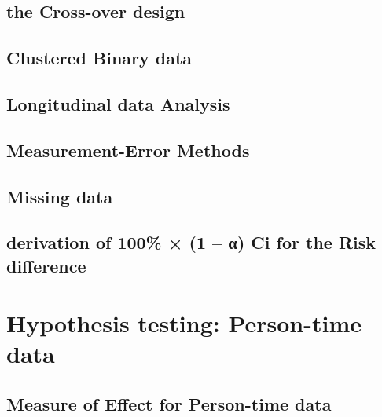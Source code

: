 \documentclass[12pt,]{article}
\begin{document}
\hypertarget{the-cross-over-design}{%
\subsection{the Cross-over design}\label{the-cross-over-design}}

\hypertarget{clustered-binary-data}{%
\subsection{Clustered Binary data}\label{clustered-binary-data}}

\hypertarget{longitudinal-data-analysis}{%
\subsection{Longitudinal data
Analysis}\label{longitudinal-data-analysis}}

\hypertarget{measurement-error-methods}{%
\subsection{Measurement-Error Methods}\label{measurement-error-methods}}

\hypertarget{missing-data}{%
\subsection{Missing data}\label{missing-data}}

\hypertarget{derivation-of-100-1--ci-for-the-risk-difference}{%
\subsection{derivation of 100\% × (1 -- α) Ci for the Risk
difference}\label{derivation-of-100-1--ci-for-the-risk-difference}}

\hypertarget{hypothesis-testing-person-time-data}{%
\section{Hypothesis testing: Person-time
data}\label{hypothesis-testing-person-time-data}}

\hypertarget{measure-of-effect-for-person-time-data}{%
\subsection{Measure of Effect for Person-time
data}\label{measure-of-effect-for-person-time-data}}
\end{document}
